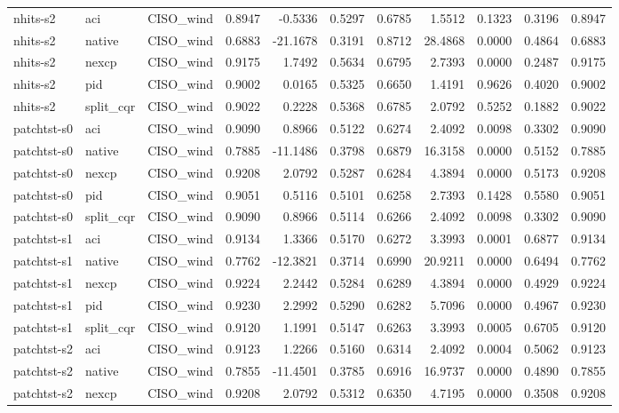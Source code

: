 \begin{tabular}{lllrrrrrrrr}
nhits-s2 & aci & CISO_wind & 0.8947 & -0.5336 & 0.5297 & 0.6785 & 1.5512 & 0.1323 & 0.3196 & 0.8947 \\
nhits-s2 & native & CISO_wind & 0.6883 & -21.1678 & 0.3191 & 0.8712 & 28.4868 & 0.0000 & 0.4864 & 0.6883 \\
nhits-s2 & nexcp & CISO_wind & 0.9175 & 1.7492 & 0.5634 & 0.6795 & 2.7393 & 0.0000 & 0.2487 & 0.9175 \\
nhits-s2 & pid & CISO_wind & 0.9002 & 0.0165 & 0.5325 & 0.6650 & 1.4191 & 0.9626 & 0.4020 & 0.9002 \\
nhits-s2 & split_cqr & CISO_wind & 0.9022 & 0.2228 & 0.5368 & 0.6785 & 2.0792 & 0.5252 & 0.1882 & 0.9022 \\
patchtst-s0 & aci & CISO_wind & 0.9090 & 0.8966 & 0.5122 & 0.6274 & 2.4092 & 0.0098 & 0.3302 & 0.9090 \\
patchtst-s0 & native & CISO_wind & 0.7885 & -11.1486 & 0.3798 & 0.6879 & 16.3158 & 0.0000 & 0.5152 & 0.7885 \\
patchtst-s0 & nexcp & CISO_wind & 0.9208 & 2.0792 & 0.5287 & 0.6284 & 4.3894 & 0.0000 & 0.5173 & 0.9208 \\
patchtst-s0 & pid & CISO_wind & 0.9051 & 0.5116 & 0.5101 & 0.6258 & 2.7393 & 0.1428 & 0.5580 & 0.9051 \\
patchtst-s0 & split_cqr & CISO_wind & 0.9090 & 0.8966 & 0.5114 & 0.6266 & 2.4092 & 0.0098 & 0.3302 & 0.9090 \\
patchtst-s1 & aci & CISO_wind & 0.9134 & 1.3366 & 0.5170 & 0.6272 & 3.3993 & 0.0001 & 0.6877 & 0.9134 \\
patchtst-s1 & native & CISO_wind & 0.7762 & -12.3821 & 0.3714 & 0.6990 & 20.9211 & 0.0000 & 0.6494 & 0.7762 \\
patchtst-s1 & nexcp & CISO_wind & 0.9224 & 2.2442 & 0.5284 & 0.6289 & 4.3894 & 0.0000 & 0.4929 & 0.9224 \\
patchtst-s1 & pid & CISO_wind & 0.9230 & 2.2992 & 0.5290 & 0.6282 & 5.7096 & 0.0000 & 0.4967 & 0.9230 \\
patchtst-s1 & split_cqr & CISO_wind & 0.9120 & 1.1991 & 0.5147 & 0.6263 & 3.3993 & 0.0005 & 0.6705 & 0.9120 \\
patchtst-s2 & aci & CISO_wind & 0.9123 & 1.2266 & 0.5160 & 0.6314 & 2.4092 & 0.0004 & 0.5062 & 0.9123 \\
patchtst-s2 & native & CISO_wind & 0.7855 & -11.4501 & 0.3785 & 0.6916 & 16.9737 & 0.0000 & 0.4890 & 0.7855 \\
patchtst-s2 & nexcp & CISO_wind & 0.9208 & 2.0792 & 0.5312 & 0.6350 & 4.7195 & 0.0000 & 0.3508 & 0.9208 \\

\end{tabular}
